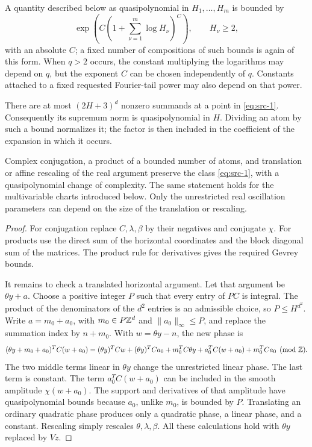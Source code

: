 A quantity described below as quasipolynomial in \(H_1,\ldots,H_m\) is
bounded by
\[
 \exp\!\left(C\left(1+\sum_{\nu=1}^m\log H_\nu\right)^C\right),
 \qquad H_\nu\ge2,
\]
with an absolute \(C\); a fixed number of compositions of such bounds
is again of this form.  When \(q>2\) occurs, the constant multiplying
the logarithms may depend on \(q\), but the exponent \(C\) can be chosen
independently of \(q\).  Constants attached to a fixed requested
Fourier-tail power may also depend on that power.

There are at most \((2H+3)^d\) nonzero summands at a point in
\eqref{eq:src-1}.  Consequently its supremum norm is quasipolynomial in
\(H\).  Dividing an atom by such a bound normalizes it; the factor is
then included in the coefficient of the expansion in which it occurs.

\begin{lemma}\label{lem:chart-operations}
Complex conjugation, a product of a bounded number of atoms, and
translation or affine rescaling of the real argument preserve the class
\eqref{eq:src-1}, with a quasipolynomial change of complexity.  The same
statement holds for the multivariable charts introduced below.
Only the unrestricted real oscillation parameters can depend on the
size of the translation or rescaling.
\end{lemma}

\begin{proof}
For conjugation replace \(C,\lambda,\beta\) by their negatives and
conjugate \(\chi\).  For products use the direct sum of the horizontal
coordinates and the block diagonal sum of the matrices.  The product
rule for derivatives gives the required Gevrey bounds.

It remains to check a translated horizontal argument.  Let that argument
be \(\theta y+a\).  Choose a positive integer \(P\) such that every
entry of \(PC\) is integral.  The product of the denominators of the
\(d^2\) entries is an admissible choice, so
\(P\le H^{d^2}\).  Write \(a=m_0+a_0\), with
\(m_0\in P\mathbb Z^d\) and \(\|a_0\|_\infty\le P\), and replace the summation
index by \(n+m_0\).  With \(w=\theta y-n\), the new phase is
\[
 (\theta y+m_0+a_0)^TC(w+a_0)
 =(\theta y)^TCw
    +(\theta y)^TCa_0+m_0^TC\theta y
    +a_0^TC(w+a_0)+m_0^TCa_0
       \pmod{\mathbb Z}.
\]
The two middle terms linear in \(\theta y\) change the unrestricted
linear phase.  The last term is constant.  The term
\(a_0^TC(w+a_0)\) can be included in the smooth amplitude
\(\chi(w+a_0)\).  The support and derivatives of that amplitude have
quasipolynomial bounds because \(a_0\), unlike \(m_0\), is bounded by
\(P\).  Translating an ordinary quadratic phase produces only a
quadratic phase, a linear phase, and a constant.  Rescaling simply
rescales \(\theta,\lambda,\beta\).
All these calculations hold with \(\theta y\) replaced by \(Vz\).
\end{proof}

